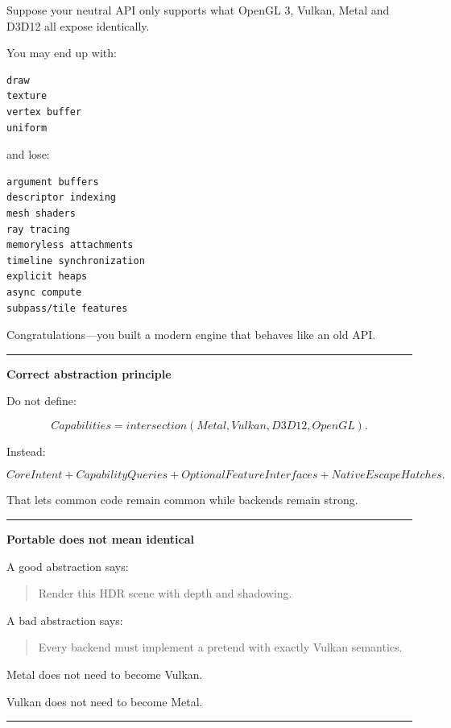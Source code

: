 Suppose your neutral API only supports what OpenGL 3, Vulkan, Metal and D3D12 all expose identically.

You may end up with:

\begin{verbatim}
draw
texture
vertex buffer
uniform
\end{verbatim}

and lose:

\begin{verbatim}
argument buffers
descriptor indexing
mesh shaders
ray tracing
memoryless attachments
timeline synchronization
explicit heaps
async compute
subpass/tile features
\end{verbatim}

Congratulations---you built a modern engine that behaves like an old API.

\begin{center}\rule{0.5\linewidth}{0.5pt}\end{center}

\textbf{Correct abstraction principle}

Do not define:

\[
\boxed{
Capabilities=
intersection(
Metal,
Vulkan,
D3D12,
OpenGL).
}
\]

Instead:

\[
\boxed{
CoreIntent
+
CapabilityQueries
+
OptionalFeatureInterfaces
+
NativeEscapeHatches.
}
\]

That lets common code remain common while backends remain strong.

\begin{center}\rule{0.5\linewidth}{0.5pt}\end{center}

\textbf{Portable does not mean identical}

A good abstraction says:

\begin{quote}
Render this HDR scene with depth and shadowing.
\end{quote}

A bad abstraction says:

\begin{quote}
Every backend must implement a pretend  with exactly Vulkan semantics.
\end{quote}

Metal does not need to become Vulkan.

Vulkan does not need to become Metal.

\begin{center}\rule{0.5\linewidth}{0.5pt}\end{center}

